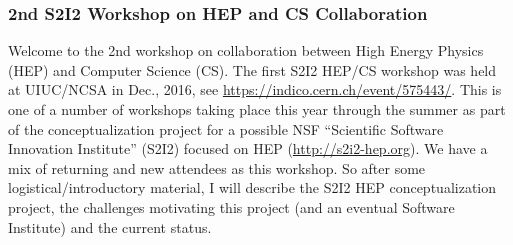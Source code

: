 \begin{frame}
\frametitle{2nd S2I2 Workshop on HEP and CS Collaboration}

Welcome to the 2nd workshop on collaboration between High Energy 
Physics (HEP) and Computer Science (CS).
\vskip 0.15in
The first S2I2 HEP/CS workshop was held at UIUC/NCSA in Dec., 2016, see
\url{https://indico.cern.ch/event/575443/}.
\vskip 0.15in
This is one of a number of workshops taking place this year through the summer as part of the conceptualization project for a possible NSF ``Scientific Software Innovation Institute'' (S2I2) focused on HEP (\url{http://s2i2-hep.org}).
\vskip 0.15in
We have a mix of returning and new attendees as this workshop. So after
some logistical/introductory material, I will describe the S2I2 HEP 
conceptualization project, the challenges motivating this project (and an eventual Software Institute) and the current status.
\vskip 0.15in

\end{frame}



